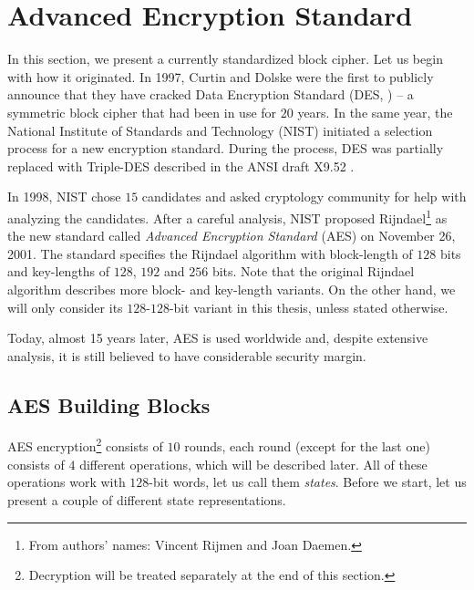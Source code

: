 \section{Advanced Encryption Standard}
\label{sec:aes}

In this section, we present a currently standardized block cipher. Let us begin with how it originated. In 1997, Curtin and Dolske were the first to publicly announce \cite{curtin1998brute} that they have cracked Data Encryption Standard (DES, \cite{fips1977des}) -- a symmetric block cipher that had been in use for $20$ years. In the same year, the National Institute of Standards and Technology (NIST) initiated a selection process for a new encryption standard. During the process, DES was partially replaced with Triple-DES described in the ANSI draft X9.52 \cite{americantripple}.

In 1998, NIST chose $15$ candidates and asked cryptology community for help with analyzing the candidates. After a careful analysis, NIST proposed Rijndael\footnote{From authors' names: Vincent Rijmen and Joan Daemen.} \cite{daemen1999aes} as the new standard called {\em Advanced Encryption Standard} (AES) \cite{fips2001aes} on November 26, 2001. The standard specifies the Rijndael algorithm with block-length of $128$ bits and key-lengths of $128$, $192$ and $256$ bits. Note that the original Rijndael algorithm \cite{daemen2013rijndael} describes more block- and key-length variants. On the other hand, we will only consider its $128$-$128$-bit variant in this thesis, unless stated otherwise.

Today, almost 15 years later, AES is used worldwide and, despite extensive analysis, it is still believed to have considerable security margin.



\subsection{AES Building Blocks}

AES encryption\footnote{Decryption will be treated separately at the end of this section.} consists of $10$ rounds, each round (except for the last one) consists of $4$ different operations, which will be described later. All of these operations work with $128$-bit words, let us call them {\em states}. Before we start, let us present a couple of different state representations. 

